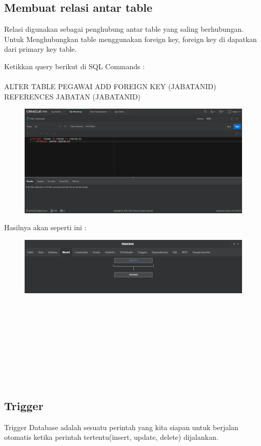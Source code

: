\documentclass[12pt, times new roman, a4paper]{report}
\begin{document}
\subsection{Membuat relasi antar table}
\hspace{1cm} Relasi digunakan sebagai penghubung antar table yang saling berhubungan. Untuk Menghubungkan table menggunakan foreign key, foreign key di dapatkan dari primary key table.
\\
\par Ketikkan query berikut di SQL Commands :\\
\\
ALTER TABLE  PEGAWAI ADD FOREIGN KEY (JABATAN\textunderscore ID)\\
	  REFERENCES  JABATAN (JABATAN\textunderscore ID)
\begin{figure}[h]
	\centering
		\includegraphics[scale=0.3]{gambar/10}
\end{figure}
\par Hasilnya akan seperti ini :
\begin{figure}[h]
	\centering
		\includegraphics[scale=0.5]{gambar/11}
\end{figure}
\\
\\
\\
\\
\\
\\
\\
\\
\subsection{Trigger}
\hspace{1cm} Trigger Database adalah sesuatu perintah yang kita siapan untuk berjalan otomatis ketika perintah tertentu(insert, update, delete) dijalankan.
\end{document}
